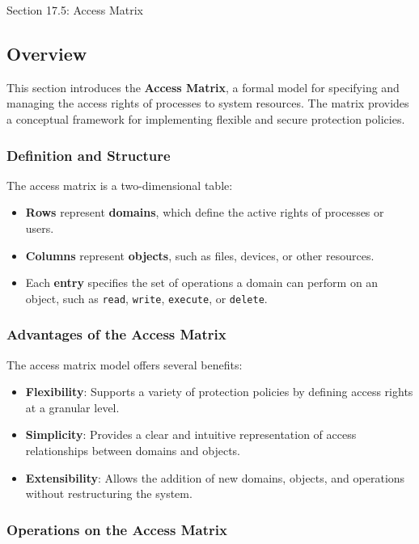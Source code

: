 \begin{notes}{Section 17.5: Access Matrix}
    \subsection*{Overview}

    This section introduces the \textbf{Access Matrix}, a formal model for specifying and managing the access rights of processes to system resources. The matrix provides a conceptual framework for 
    implementing flexible and secure protection policies.
    
    \subsubsection*{Definition and Structure}
    
    The access matrix is a two-dimensional table:
    \begin{itemize}
        \item \textbf{Rows} represent \textbf{domains}, which define the active rights of processes or users.
        \item \textbf{Columns} represent \textbf{objects}, such as files, devices, or other resources.
        \item Each \textbf{entry} specifies the set of operations a domain can perform on an object, such as \texttt{read}, \texttt{write}, \texttt{execute}, or \texttt{delete}.
    \end{itemize}
    
    \subsubsection*{Advantages of the Access Matrix}
    
    The access matrix model offers several benefits:
    \begin{itemize}
        \item \textbf{Flexibility}: Supports a variety of protection policies by defining access rights at a granular level.
        \item \textbf{Simplicity}: Provides a clear and intuitive representation of access relationships between domains and objects.
        \item \textbf{Extensibility}: Allows the addition of new domains, objects, and operations without restructuring the system.
    \end{itemize}
    
    \subsubsection*{Operations on the Access Matrix}
    

\end{notes}
